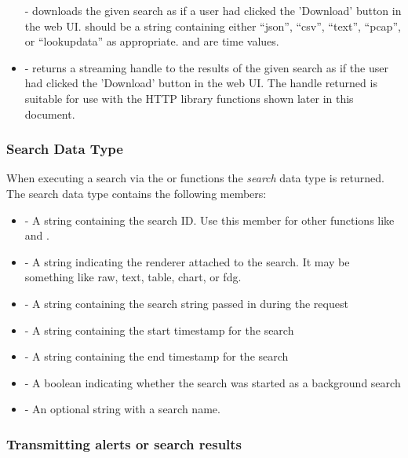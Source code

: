 \begin{itemize}
   - downloads the given search as if a user had clicked the
  'Download' button in the web UI.  should be a string containing
  either ``json'', ``csv'', ``text'', ``pcap'', or ``lookupdata'' as appropriate.
   and  are time values.
\item
   - returns a streaming handle to the results of the given
  search as if the user had clicked the 'Download' button in the web UI.
  The handle returned is suitable for use with the HTTP library
  functions shown later in this document.
\end{itemize}

\subsubsection{Search Data Type}

When executing a search via the  or
 functions the \emph{search} data type is
returned. The search data type contains the following members:

\begin{itemize}
\tightlist
\item
   - A string containing the search ID. Use this member for other
  functions like  and .
\item
   - A string indicating the renderer attached to the
  search. It may be something like raw, text, table, chart, or fdg.
\item
   - A string containing the search string passed in
  during the request
\item
   - A string containing the start timestamp for the
  search
\item
   - A string containing the end timestamp for the search
\item
   - A boolean indicating whether the search was started as
  a background search
\item
   - An optional string with a search name.
\end{itemize}

\subsubsection{Transmitting alerts or search results}

